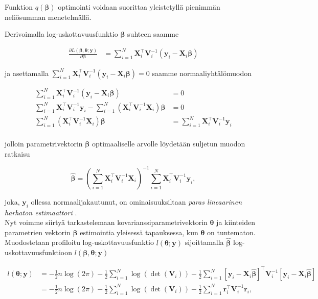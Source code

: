 \documentclass[finnish]{docopts}
\begin{document}
Funktion $q(\bm{\beta})$ optimointi voidaan suorittaa yleistetyllä pienimmän neliösumman menetelmällä.

Derivoimalla log-uskottavuusfunktio $\bm{\beta}$ suhteen saamme

$$
\begin{aligned}
\frac{\partial L(\bm{\beta}, \bm{\theta};\bm{y})}{\partial \bm{\beta}} &= \sum\limits_{i=1}^{N}\bm{X}_{i}^\top \bm{V}_i^{-1} (\bm{y}_i - \bm{X}_{i} \bm{\beta})
\end{aligned}
$$

ja asettamalla $\sum\limits_{i=1}^{N}\bm{X}_{i}^\top \bm{V}_i^{-1} (\bm{y}_i - \bm{X}_{i} \bm{\beta}) = 0$ saamme normaaliyhtälömuodon

$$
\begin{aligned}
\sum\limits_{i=1}^{N}\bm{X}_{i}^\top \bm{V}_i^{-1} (\bm{y}_i - \bm{X}_{i} \bm{\beta}) &= 0 \\
\sum\limits_{i=1}^{N}\bm{X}_{i}^\top \bm{V}_i^{-1}\bm{y}_i - \sum\limits_{i=1}^{N}(\bm{X}_{i}^\top \bm{V}_i^{-1}\bm{X}_{i}) \bm{\beta} &= 0 \\
 \sum\limits_{i=1}^{N}(\bm{X}_{i}^\top \bm{V}_i^{-1}\bm{X}_{i}) \bm{\beta} &= \sum\limits_{i=1}^{N}\bm{X}_{i}^\top \bm{V}_i^{-1}\bm{y}_i \\
\end{aligned}
$$


jolloin parametrivektorin $\bm{\beta}$ optimaaliselle arvolle löydetään suljetun muodon ratkaisu

$$
\hat{\bm{\beta}} =  (\sum\limits_{i=1}^{N} \bm{X}_{i}^\top \bm{V}_i^{-1} \bm{X}_{i})^{-1} \sum\limits_{i=1}^{N} \bm{X}_{i}^\top \bm{V}_i^{-1} \bm{y}_i,
$$

joka, $\bm{y}_i$ ollessa normaalijakautunut, on ominaisuuksiltaan \textit{paras lineaarinen harhaton estimaattori} \cite{west14}.\\

Nyt voimme siirtyä tarkastelemaan kovarianssiparametrivektorin $\bm{\theta}$ ja kiinteiden parametrien vektorin $\bm{\beta}$ estimointia yleisessä tapauksessa, kun $\bm{\theta}$ on tuntematon.\\

Muodostetaan profiloitu log-uskottavuusfunktio $l(\bm{\theta} ; \bm{y})$ sijoittamalla $\hat{\bm{\beta}}$ log-uskottavuusfunktioon $l(\bm{\beta}, \bm{\theta};\bm{y})$

$$
\begin{aligned}
l(\bm{\theta};\bm{y}) &= -\frac{1}{2} n \log (2\pi) -\frac{1}{2} \sum\limits_{i=1}^{N} \log (\det (\bm{V}_i)) -\frac{1}{2} \sum\limits_{i=1}^{N} [\bm{y}_i - \bm{X}_i \hat{\bm{\beta}}]^\top \bm{V}_i^{-1} [\bm{y}_i - \bm{X}_i \hat{\bm{\beta}}] \\
&= -\frac{1}{2} n \log (2\pi) -\frac{1}{2} \sum\limits_{i=1}^{N} \log (\det (\bm{V}_i)) -\frac{1}{2} \sum\limits_{i=1}^{N} \bm{r}_{i}^\top \bm{V}_i^{-1} \bm{r}_{i},
\end{aligned}
$$
\end{document}
